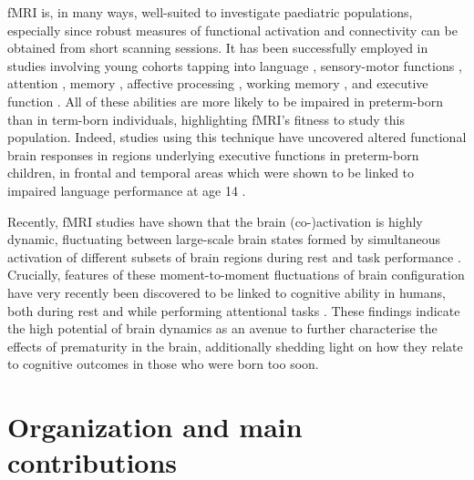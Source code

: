 fMRI is, in many ways, well-suited to investigate paediatric populations, especially since robust measures of functional activation and connectivity can be obtained from short scanning sessions. It has been successfully employed in studies involving young cohorts tapping into language \citep{Centeno2014, Pigdon2020}, sensory-motor functions \citep{Zwicker2011, Sgandurra2018}, attention \citep{Somandepalli2015, Jiang2019, Harrewijn2020}, memory \citep{Mankinen2015, DeBie2015}, affective processing \citep{Loveland2008, McRae2012}, working memory \citep{Siffredi2017, Yaple2018}, and executive function \citep{Wang2013, Staphorsius2015}. All of these abilities are more likely to be impaired in preterm-born than in term-born individuals, highlighting fMRI's fitness to study this population. Indeed, studies using this technique have uncovered altered functional brain responses in regions underlying executive functions in preterm-born children, in frontal \citep{Murner-Lavanchy2014} and temporal areas \citep{Kwon2014a, Wilke2014} which were shown to be linked to impaired language performance at age 14 \citep{Wilke2014}.
  
Recently, fMRI studies have shown that the brain (co-)activation is highly dynamic, fluctuating between large-scale brain states formed by simultaneous activation of different subsets of brain regions during rest \citep{Chang2010, Preti2017, Liu2018} and task performance \citep{Di2015, Cheng2018}. Crucially, features of these moment-to-moment fluctuations of brain configuration have very recently been discovered to be linked to cognitive ability in humans, both during rest \cite{Chen2019} and while performing attentional tasks \cite{Fong2019}. These findings indicate the high potential of brain dynamics as an avenue to further characterise the effects of prematurity in the brain, additionally shedding light on how they relate to cognitive outcomes in those who were born too soon. 
 


\section{Organization and main contributions}


